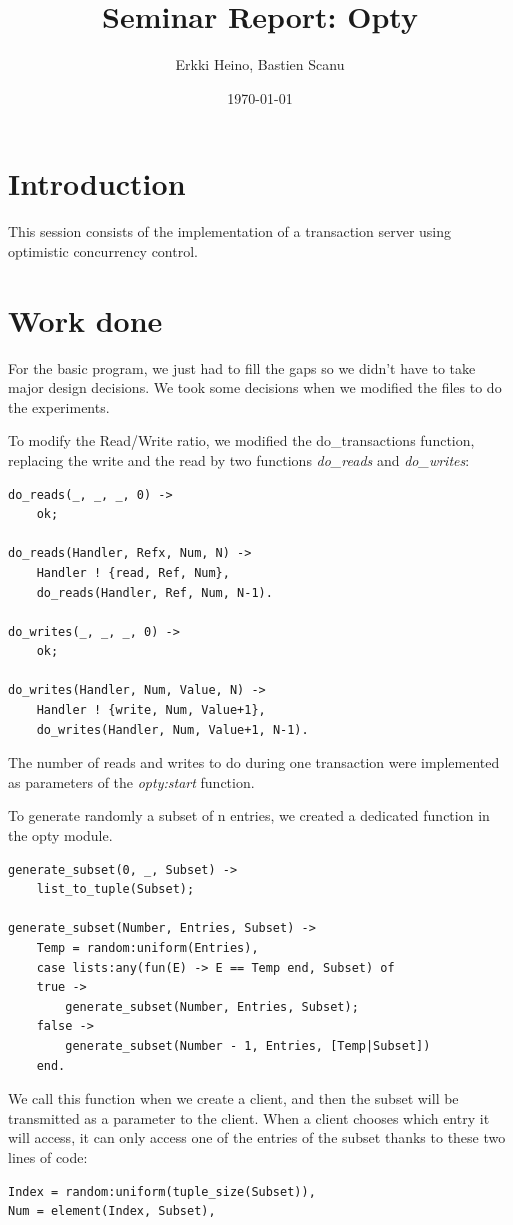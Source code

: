 \documentclass[a4paper, 11pt]{article}
\title{Seminar Report: Opty}
\author{Erkki Heino, Bastien Scanu}
\date{\today{}}
\begin{document}
\maketitle

\section{Introduction}
This session consists of the implementation of a transaction server using optimistic concurrency control.

\section{Work done}
For the basic program, we just had to fill the gaps so we didn't have to take major design decisions. We took some decisions when we modified the files to do the experiments.

To modify the Read/Write ratio, we modified the do\_transactions function, replacing the write and the read by two functions \emph{do\_reads} and \emph{do\_writes}:

\lstset{language=erlang}   
\begin{lstlisting}
do_reads(_, _, _, 0) ->
    ok;

do_reads(Handler, Refx, Num, N) ->
    Handler ! {read, Ref, Num},
    do_reads(Handler, Ref, Num, N-1).

do_writes(_, _, _, 0) ->
    ok;

do_writes(Handler, Num, Value, N) ->
    Handler ! {write, Num, Value+1},
    do_writes(Handler, Num, Value+1, N-1).

\end{lstlisting}

The number of reads and writes to do during one transaction were implemented as parameters of the \emph{opty:start} function.

To generate randomly a subset of n entries, we created a dedicated function in the opty module.
\begin{lstlisting}
generate_subset(0, _, Subset) ->
    list_to_tuple(Subset);

generate_subset(Number, Entries, Subset) ->
    Temp = random:uniform(Entries),
    case lists:any(fun(E) -> E == Temp end, Subset) of
	true ->
	    generate_subset(Number, Entries, Subset);
	false ->
	    generate_subset(Number - 1, Entries, [Temp|Subset])
    end.
\end{lstlisting}

We call this function when we create a client, and then the subset will be transmitted as a parameter to the client. When a client chooses which entry it will access, it can only access one of the entries of the subset thanks to these two lines of code:
\begin{lstlisting}
Index = random:uniform(tuple_size(Subset)),
Num = element(Index, Subset),
\end{lstlisting}
\end{document}
